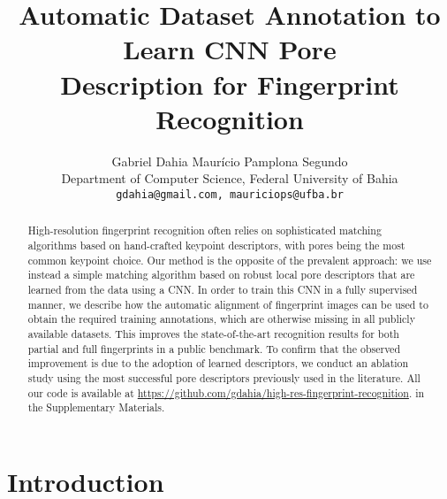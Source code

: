 \documentclass[10pt,twocolumn,letterpaper]{article}
\begin{document}
\title{Automatic Dataset Annotation to Learn CNN Pore \\ Description for Fingerprint Recognition}

\author{Gabriel Dahia \hspace{2cm} Maur\' icio Pamplona Segundo \\
Department of Computer Science, Federal University of Bahia \\
{\tt\small gdahia@gmail.com, mauriciops@ufba.br} \\
}

\maketitle
\ifcvprfinal\thispagestyle{empty}\fi

\begin{abstract}
  High-resolution fingerprint recognition often relies on sophisticated matching algorithms based on hand-crafted keypoint descriptors, with pores being the most common keypoint choice.
  Our method is the opposite of the prevalent approach: we use instead a simple matching algorithm based on robust local pore descriptors that are learned from the data using a CNN.
  In order to train this CNN in a fully supervised manner, we describe how the automatic alignment of fingerprint images can be used to obtain the required training annotations, which are otherwise missing in all publicly available datasets.
  This improves the state-of-the-art recognition results for both partial and full fingerprints in a public benchmark.
  To confirm that the observed improvement is due to the adoption of learned descriptors, we conduct an ablation study using the most successful pore descriptors previously used in the literature.
  All our code is available 
  \ifcvprfinal
  at \url{https://github.com/gdahia/high-res-fingerprint-recognition}.
  \else
  in the Supplementary Materials.
  \fi
\end{abstract}

\section{Introduction}
\end{document}
